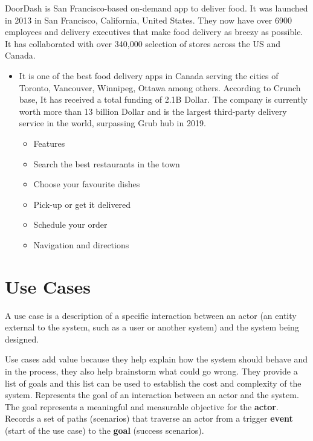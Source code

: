 \documentclass[12pt]{article}
\begin{document}
DoorDash is San Francisco-based on-demand app to deliver food. It was launched in 2013 in San Francisco, California, United States. They now have over 6900 employees and delivery executives that make food delivery as breezy as possible. It has collaborated with over 340,000 selection of stores across the US and Canada.
\begin{itemize}
\item It is one of the best food delivery apps in Canada serving the cities of Toronto, Vancouver, Winnipeg, Ottawa among others. According to Crunch base, It has received a total funding of 2.1B Dollar. The company is currently worth more than 13 billion Dollar and is the largest third-party delivery service in the world, surpassing Grub hub in 2019.
\begin{itemize}
\item Features
\item Search the best restaurants in the town
\item Choose your favourite dishes
\item Pick-up or get it delivered
\item Schedule your order
\item Navigation and directions

\end{itemize}


\end{itemize}


\section{Use Cases}
A use case is a description of a specific interaction between an actor (an entity external to the system, such as a user or another system) and the system being designed.

Use cases add value because they help explain how the system should behave and in the process, they also help brainstorm what could go wrong.  They provide a list of goals and this list can be used to establish the cost and complexity of the system.
Represents the goal of an interaction between an actor and the system. The goal represents a meaningful and measurable objective for the \textbf{actor}. Records a set of paths (scenarios) that traverse an actor from a trigger \textbf{event} (start of the use case) to the \textbf{goal} (success scenarios).
\end{document}
